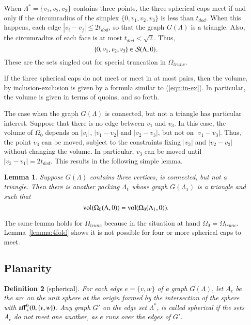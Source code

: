 \documentclass{article} %
\newtheorem{lemma}{Lemma}[subsection]
\newtheorem{definition}[lemma]{Definition}
\begin{document}
When $\Lambda^*=\{v_1,v_2,v_3\}$ contains three points, the three
spherical caps meet if and only if the circumradius of the simplex
$\{0,v_1,v_2,v_3\}$ is less than $t_{dod}$. When this happens, each
edge $|v_i-v_j|\le 2t_{dod}$, so that the graph $G(\Lambda)$ is a
triangle. Also, the circumradius of each face is at most $t_{dod} <
\sqrt2$. Thus,
$$\{0,v_1,v_2,v_3\}\in{\mathcal S}(\Lambda,0).$$
These are the sets singled out for special truncation in
$\Omega_{trunc}$.

If the three spherical caps do not meet or meet in at most pairs,
then the volume, by inclusion-exclusion is given by a formula
similar to (\ref{eqn:in-ex}).  In particular, the volume
is given in terms of quoins, and so forth.

The case when the graph $G(\Lambda)$ is connected, but not a triangle
has particular interest.  Suppose that there is no edge between
$v_1$ and $v_3$. In this case, the volume of $\Omega_0$ depends on
$|v_i|$, $|v_1-v_2|$ and $|v_2-v_3|$, but not on $|v_1-v_3|$.
Thus, the point $v_3$ can be moved, subject to the constraints
fixing $|v_3|$ and $|v_2-v_3|$ without changing the volume.
In particular, $v_3$ can be moved until $|v_3-v_1|=2t_{dod}$.  This
results in the following simple lemma.  

\begin{lemma}
\label{lemma:3tri}  
Suppose $G(\Lambda)$ contains three vertices,
is connected, but not a triangle.  Then there is another packing
$\Lambda_1$ whose graph $G(\Lambda_1)$ is a triangle and such
that
$$
{\operatorname{vol}}(\Omega_0(\Lambda,0)) = {\operatorname{vol}}(\Omega_0(\Lambda_1,0)).
$$
\end{lemma}

The same lemma holds for $\Omega_{trunc}$ because in the situation at
hand $\Omega_0=\Omega_{trunc}$. Lemma~\ref{lemma:4fold} shows it is
not possible for four or more spherical caps to meet.

\subsection{Planarity}

\begin{definition}[spherical]
For each edge $e=\{v,w\}$ of a graph $G(\Lambda)$, let $A_e$ be the
arc on the unit sphere at the origin formed by the intersection of the
sphere with ${\operatorname{aff}}^0_+(0,\{v,w\})$. Any graph $G'$ on the edge set
$\Lambda^*$, is called \emph{spherical} if the sets $A_e$ do not meet
one another, as $e$ runs over the edges of $G'$.
\end{definition}
\end{document}
